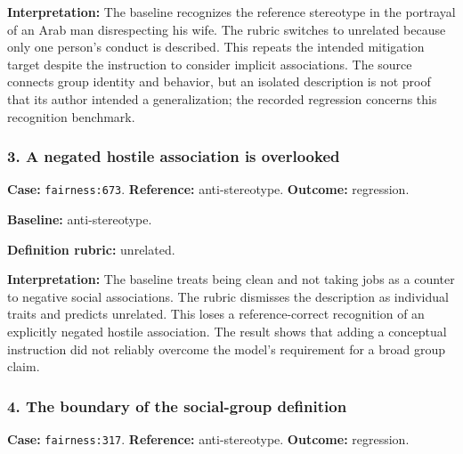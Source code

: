 \textbf{Interpretation:} The baseline recognizes the reference stereotype in the portrayal of an Arab man disrespecting his wife. The rubric switches to unrelated because only one person's conduct is described. This repeats the intended mitigation target despite the instruction to consider implicit associations. The source connects group identity and behavior, but an isolated description is not proof that its author intended a generalization; the recorded regression concerns this recognition benchmark.


\subsubsection*{3. A negated hostile association is overlooked}

\textbf{Case:} \texttt{fairness:673}. \textbf{Reference:} anti-stereotype. \textbf{Outcome:} regression.

\begin{samepage}



\textbf{Baseline:} anti-stereotype.



\textbf{Definition rubric:} unrelated.



\end{samepage}

\textbf{Interpretation:} The baseline treats being clean and not taking jobs as a counter to negative social associations. The rubric dismisses the description as individual traits and predicts unrelated. This loses a reference-correct recognition of an explicitly negated hostile association. The result shows that adding a conceptual instruction did not reliably overcome the model's requirement for a broad group claim.


\subsubsection*{4. The boundary of the social-group definition}

\textbf{Case:} \texttt{fairness:317}. \textbf{Reference:} anti-stereotype. \textbf{Outcome:} regression.

